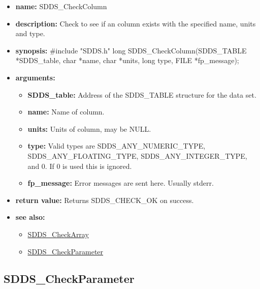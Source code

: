 \documentclass[11pt]{article}
\newcommand{\progref}[1]{\hyperref{SDDS_#1}{{\tt SDDS\_#1} (}{)}{SDDS_#1}}
\begin{document}
\begin{itemize}
\item {\bf name:}\newline
SDDS\_CheckColumn
\item {\bf description:}\newline
Check to see if an column exists with the specified name, units and type.
\item {\bf synopsis:} \#include "SDDS.h"\newline
long SDDS\_CheckColumn(SDDS\_TABLE *SDDS\_table, char *name, char *units, long type, FILE *fp\_message);
\item {\bf arguments:}
\begin{itemize}
\item {\bf SDDS\_table:} Address of the SDDS\_TABLE structure for the data set.
\item {\bf name:} Name of column.
\item {\bf units:} Units of column, may be NULL.
\item {\bf type:} Valid types are SDDS\_ANY\_NUMERIC\_TYPE, SDDS\_ANY\_FLOATING\_TYPE, SDDS\_ANY\_INTEGER\_TYPE, and 0. If 0 is used this is ignored.
\item {\bf fp\_message:} Error messages are sent here. Usually stderr.
\end{itemize}
\item {\bf return value:}\newline
Returns SDDS\_CHECK\_OK on success.
\item {\bf see also:}
\begin{itemize}
\item \progref{CheckArray}
\item \progref{CheckParameter}
\end{itemize}
\end{itemize}

\subsection{SDDS\_CheckParameter}
\label{SDDS_CheckParameter}
\end{document}
